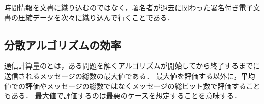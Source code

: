 \documentclass[a4paper,12pt]{jsarticle}
\begin{document}
時間情報を文書に織り込むのではなく，署名者が過去に関わった署名付き電子文書の圧縮データを次々に織り込んで行くことである．









\subsection{分散アルゴリズムの効率}%
\label{Algorithm_efficiency}
通信計算量のとは，ある問題を解くアルゴリズムが開始してから終了するまでに送信されるメッセージの総数の最大値である．
最大値を評価する以外に，平均値での評価やメッセージの総数ではなくメッセージの総ビット数で評価することもある．
最大値で評価するのは最悪のケースを想定することを意味する．
\end{document}
